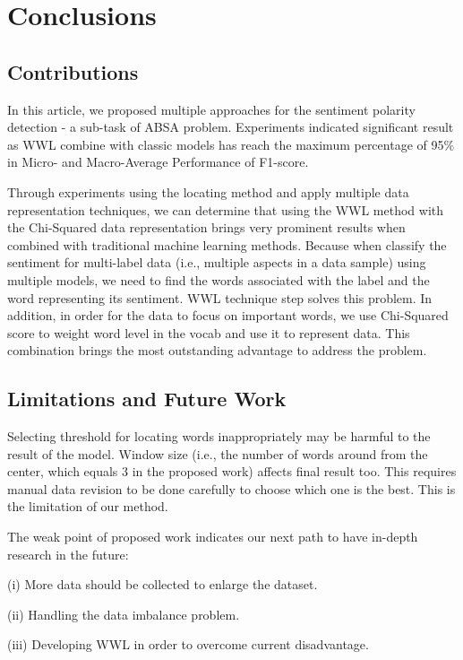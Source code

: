 \chapter{Conclusions}
\label{chap:conclusion}

\section*{Contributions}
In this article, we proposed multiple approaches for the sentiment polarity detection - a sub-task of ABSA problem. Experiments indicated significant result as WWL combine with classic models has reach the maximum percentage of 95\% in Micro- and Macro-Average Performance of F1-score.

Through experiments using the locating method and apply multiple data representation techniques, we can determine that using the WWL method with the Chi-Squared data representation brings very prominent results when combined with traditional machine learning methods. Because when classify the sentiment for multi-label data (i.e., multiple aspects in a data sample) using multiple models, we need to find the words associated with the label and the word representing its sentiment. WWL technique step solves this problem. In addition, in order for the data to focus on important words, we use Chi-Squared score to weight word level in the vocab and use it to represent data. This combination brings the most outstanding advantage to address the problem.

\section*{Limitations and Future Work}
Selecting threshold for locating words inappropriately may be harmful to the result of the model. Window size (i.e., the number of words around from the center, which equals 3 in the proposed work) affects final result too. This requires manual data revision to be done carefully to choose which one is the best. This is the limitation of our method.

The weak point of proposed work indicates our next path to have in-depth research in the future: 

(i) More data should be collected to enlarge the dataset.

(ii) Handling the data imbalance problem.

(iii) Developing WWL in order to overcome current disadvantage.
